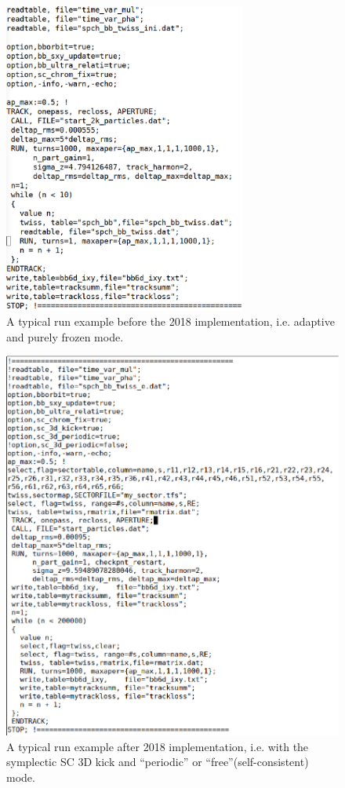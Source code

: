\begin{figure}[H]
\centering \includegraphics[width=8cm]{eps/run_example2_new}
\caption{A typical run example before the 2018 implementation,
  i.e. adaptive and purely frozen mode.}
\label{RUN_EXAMPLE}
\end{figure}

\newpage
\begin{figure}[H]
\centering \includegraphics{eps/run_example_3D2_new}
\caption{A typical run example after 2018 implementation,
  i.e. with the symplectic SC 3D kick and ``periodic'' or
  ``free''(self-consistent) mode.}
\label{RUN_EXAMPLE_3D}
\end{figure}

